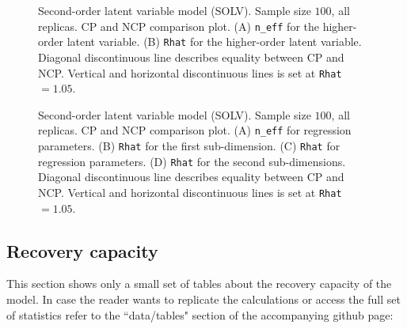 %
\begin{figure}[H]
	\centering
	\begin{subfigure}
		\texttt{[image: SOLV\_100\_neff6]}
	\end{subfigure}
	\begin{subfigure}
		\texttt{[image: SOLV\_100\_Rhat6]}
	\end{subfigure}
	\caption[Second-order latent variable model (SOLV). Sample size $100$, all replicas. CP and NCP comparison plot.]%
	{Second-order latent variable model (SOLV). Sample size $100$, all replicas. CP and NCP comparison plot. (A) \texttt{n\_eff} for the higher-order latent variable. (B) \texttt{Rhat} for the higher-order latent variable. Diagonal discontinuous line describes equality between CP and NCP. Vertical and horizontal discontinuous lines is set at \texttt{Rhat}$=1.05$. }
	\label{fig:SOLV_stat2}
\end{figure}
%
\begin{figure}[H]
	\centering
	\begin{subfigure}
		\texttt{[image: SOLV\_100\_neff2]}
	\end{subfigure}
	\begin{subfigure}
		\texttt{[image: SOLV\_100\_Rhat2]}
	\end{subfigure}
	\caption[Second-order latent variable model (SOLV). Sample size $100$, all replicas. CP and NCP comparison plot.]%
	{Second-order latent variable model (SOLV). Sample size $100$, all replicas. CP and NCP comparison plot. (A) \texttt{n\_eff} for regression parameters. (B) \texttt{Rhat} for the first sub-dimension. (C) \texttt{Rhat} for regression parameters. (D) \texttt{Rhat} for the second sub-dimensions. Diagonal discontinuous line describes equality between CP and NCP. Vertical and horizontal discontinuous lines is set at \texttt{Rhat}$=1.05$. }
	\label{fig:SOLV_stat3}
\end{figure}



\newpage
\subsection{Recovery capacity} \label{sub_sect:recovery}

This section shows only a small set of tables about the recovery capacity of the model. In case the reader wants to replicate the calculations or access the full set of statistics refer to the ``data/tables" section of the accompanying github page:


